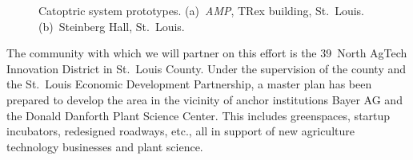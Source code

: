 \begin{figure}[ht]
\centering
{}
\qquad \qquad
{}
\caption{Catoptric system prototypes.
(a)~\emph{AMP}, TRex building, St.~Louis.
(b)~Steinberg Hall, St.~Louis.
}
\label{fig:proto}
\end{figure}

The community with which we will partner on this effort is
the 39~North AgTech Innovation District in St.~Louis County. Under the
supervision of the county and the St.~Louis Economic Development Partnership, 
a master plan has been prepared to develop the area in the vicinity of  
anchor institutions Bayer AG and the Donald Danforth Plant Science Center. 
This includes greenspaces, startup incubators, redesigned roadways, etc.,
all in support of new agriculture technology businesses and plant science.
